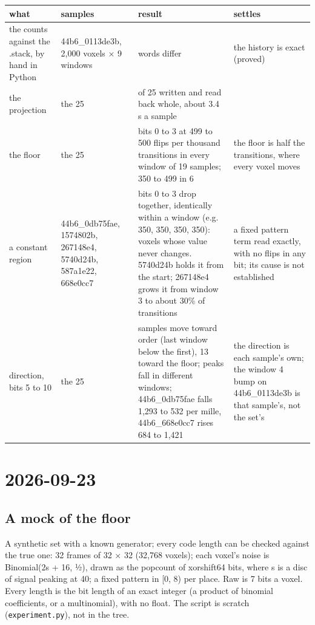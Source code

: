 {\footnotesize
\setlength{\tabcolsep}{6pt}
\begin{longtable}{>{\RaggedRight\arraybackslash}p{}>{\RaggedRight\arraybackslash}p{}>{\RaggedRight\arraybackslash}p{}>{\RaggedRight\arraybackslash}p{}}
\toprule
what & samples & result & settles \\
\midrule
\endhead
the counts against the .stack, by hand in Python & 44b6\_\allowbreak{}0113de3b, 2,000 voxels × 9 windows & 0 words differ & the history is exact (proved) \\
the projection & the 25 & 25 of 25 written and read back whole, about 3.4 s a sample &  \\
the floor & the 25 & bits 0 to 3 at 499 to 500 flips per thousand transitions in every window of 19 samples; 350 to 499 in 6 & the floor is half the transitions, where every voxel moves \\
a constant region & 44b6\_\allowbreak{}0db75fae, 1574802b, 267148e4, 5740d24b, 587a1e22, 668e0cc7 & bits 0 to 3 drop together, identically within a window (e.g. 350, 350, 350, 350): voxels whose value never changes. 5740d24b holds it from the start; 267148e4 grows it from window 3 to about 30\% of transitions & a fixed pattern term read exactly, with no flips in any bit; its cause is not established \\
direction, bits 5 to 10 & the 25 & 12 samples move toward order (last window below the first), 13 toward the floor; peaks fall in different windows; 44b6\_\allowbreak{}0db75fae falls 1,293 to 532 per mille, 44b6\_\allowbreak{}668e0cc7 rises 684 to 1,421 & the direction is each sample's own; the window 4 bump on 44b6\_\allowbreak{}0113de3b is that sample's, not the set's \\
\bottomrule
\end{longtable}
}

\section{\texorpdfstring{2026-09-23}{2026-09-23}}

\subsection{\texorpdfstring{A mock of the floor}{A mock of the floor}}

A synthetic set with a known generator; every code length can be checked against the true one: 32 frames of 32 × 32 (32,768 voxels); each voxel's noise is Binomial(2s + 16, ½), drawn as the popcount of xorshift64 bits, where s is a disc of signal peaking at 40; a fixed pattern in [0, 8) per place. Raw is 7 bits a voxel. Every length is the bit length of an exact integer (a product of binomial coefficients, or a multinomial), with no float. The script is scratch (\texttt{experiment.\allowbreak{}py}), not in the tree.

